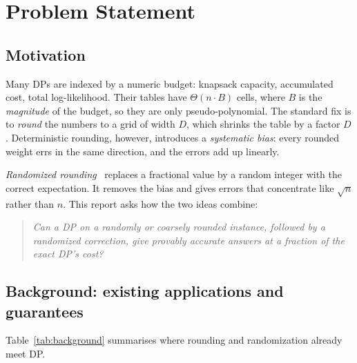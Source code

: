 \section{Problem Statement}\label{sec:problem}

\subsection{Motivation}
Many DPs are indexed by a numeric budget: knapsack capacity, accumulated cost, total
log-likelihood. Their tables have $\Theta(n\cdot B)$ cells, where $B$ is the \emph{magnitude}
of the budget, so they are only pseudo-polynomial. The standard fix is to \emph{round} the
numbers to a grid of width $D$, which shrinks the table by a factor $D$. Deterministic rounding,
however, introduces a \emph{systematic bias}: every rounded weight errs in the same direction,
and the errors add up linearly.

\emph{Randomized rounding}~\cite{raghavan1987} replaces a fractional value by a random
integer with the correct expectation. It removes the bias and gives errors that concentrate
like $\sqrt{n}$ rather than $n$. This report asks how the two ideas combine:
\begin{quote}\itshape
Can a DP on a randomly or coarsely rounded instance, followed by a randomized correction,
give provably accurate answers at a fraction of the exact DP's cost?
\end{quote}

\subsection{Background: existing applications and guarantees}
Table~\ref{tab:background} summarises where rounding and randomization already meet DP.

